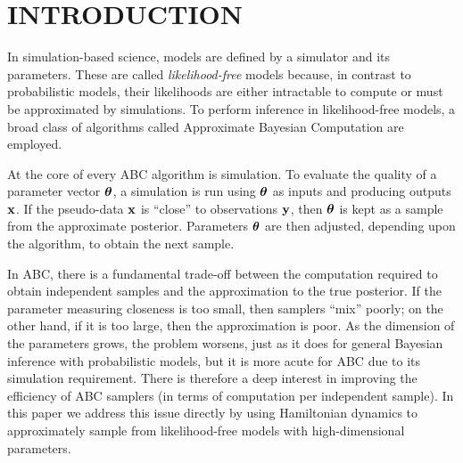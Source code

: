 \documentclass[]{article}
\begin{document}
\begin{abstract}
%
%
%
\end{abstract} 

\section{INTRODUCTION} \label{introduction}
In simulation-based science, models are defined by a simulator and its parameters.  These are called {\em likelihood-free} models because, in contrast to probabilistic models, their likelihoods are either intractable to compute or must be approximated by simulations.  To perform inference in likelihood-free models, a broad class of algorithms called Approximate Bayesian Computation \cite{beaumont2002approximate,marjoram2003markov,sisson2007sequential,sisson:2010,marin:2012,fan:2013} are employed.

At the core of every ABC algorithm is simulation.  To evaluate the quality of a parameter vector ${\bm \theta}$, a simulation is run using ${\bm \theta}$ as inputs and producing outputs ${\bf x}$.  If the pseudo-data ${\bf x}$ is ``close'' to observations ${\bf y}$, then ${\bm \theta}$ is kept as a sample from the approximate posterior.  Parameters ${\bm \theta}$ are then adjusted, depending upon the algorithm, to obtain the next sample.

In ABC, there is a fundamental trade-off between the computation required to obtain independent samples and the approximation to the true posterior.  If the parameter measuring closeness is too small, then samplers ``mix'' poorly; on the other hand, if it is too large, then the approximation is poor.  As the dimension of the parameters grows, the problem worsens, just as it does for general Bayesian inference with probabilistic models, but it is more acute for ABC due to its simulation requirement.  There is therefore a deep interest in improving the efficiency of ABC samplers (in terms of computation per independent sample).  In this paper we address this issue directly by using Hamiltonian dynamics to approximately sample from likelihood-free models with high-dimensional parameters.
\end{document}
